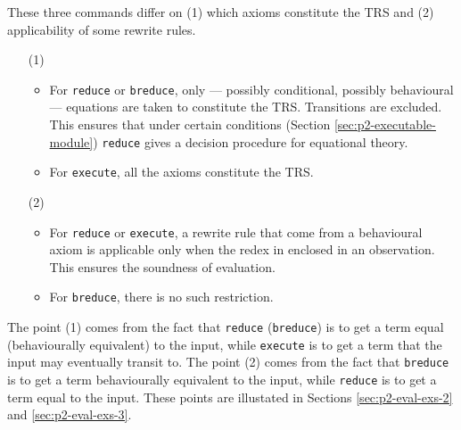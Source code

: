 \documentclass[a4paper]{memoir}
\begin{document}
These three commands differ on (1) which axioms constitute the TRS
and (2) applicability of some rewrite rules.
\begin{itemize}
\item[(1)]
  \begin{itemize}
  \item For \verb|reduce| or \verb|breduce|, only --- possibly conditional,
    possibly behavioural --- equations are taken to constitute the TRS.
    Transitions are excluded. This ensures that under certain conditions
    (Section \ref{sec:p2-executable-module}) \verb|reduce| gives a
    decision procedure for equational theory.
  \item For \verb|execute|, all the axioms constitute the TRS.
  \end{itemize}
\item[(2)]
  \begin{itemize}
  \item For \verb|reduce| or \verb|execute|, a rewrite rule that
    come from a behavioural axiom is applicable only when the
    redex in enclosed in an observation. This ensures the
    soundness of evaluation.
  \item For \verb|breduce|, there is no such restriction.
  \end{itemize}
\end{itemize}
The point (1) comes from the fact that \verb|reduce| (\verb|breduce|) is
to get a term equal (behaviourally equivalent)
to the input, while \verb|execute| is to get a term
that the input may eventually transit to.
The point (2) comes from the fact that \verb|breduce| is to get a term
behaviourally equivalent to the input, while \verb|reduce| is to get a
term equal to the input. These points are illustated in
Sections \ref{sec:p2-eval-exs-2} and \ref{sec:p2-eval-exs-3}.

\end{document}
